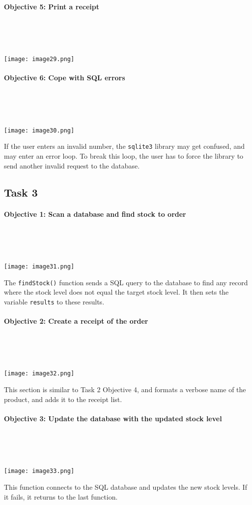 \documentclass[a4paper]{article}
\begin{document}
\paragraph{Objective 5: Print a receipt} ~\par ~\par
\noindent\texttt{[image: image29.png]} \par 
\paragraph{Objective 6: Cope with SQL errors} ~\par ~\par
\noindent\texttt{[image: image30.png]} \par
If the user enters an invalid number, the \verb|sqlite3| library may get confused, and may enter an error loop. To break this loop, the user has to force the library to send another invalid request to the database.

\newpage
\subsection{Task 3}
\paragraph{Objective 1: Scan a database and find stock to order} ~\par ~\par
\noindent\texttt{[image: image31.png]} \par 
The \verb|findStock()| function sends a SQL query to the database to find any record where the stock level does not equal the target stock level. It then sets the variable \verb?results? to these results.
\paragraph{Objective 2: Create a receipt of the order} ~\par ~\par
\noindent\texttt{[image: image32.png]} \par 
This section is similar to Task 2 Objective 4, and formats a verbose name of the product, and adds it to the receipt list.
\paragraph{Objective 3: Update the database with the updated stock level} ~\par ~\par
\noindent\texttt{[image: image33.png]} \par 
This function connects to the SQL database and updates the new stock levels. If it fails, it returns to the last function. 
\end{document}
